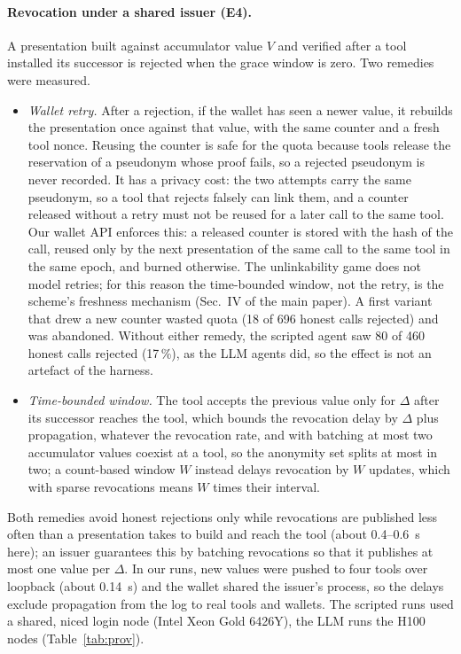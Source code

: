 \paragraph{Revocation under a shared issuer (E4).} A presentation built against accumulator value $V$ and verified after a tool installed its successor is rejected when the grace window is zero. Two remedies were measured.
\begin{itemize}[leftmargin=*]
\item \emph{Wallet retry.} After a rejection, if the wallet has seen a newer value, it rebuilds the presentation once against that value, with the same counter and a fresh tool nonce. Reusing the counter is safe for the quota because tools release the reservation of a pseudonym whose proof fails, so a rejected pseudonym is never recorded. It has a privacy cost: the two attempts carry the same pseudonym, so a tool that rejects falsely can link them, and a counter released without a retry must not be reused for a later call to the same tool. Our wallet API enforces this: a released counter is stored with the hash of the call, reused only by the next presentation of the same call to the same tool in the same epoch, and burned otherwise. The unlinkability game does not model retries; for this reason the time-bounded window, not the retry, is the scheme's freshness mechanism (Sec.~IV of the main paper). A first variant that drew a new counter wasted quota (18 of 696 honest calls rejected) and was abandoned. Without either remedy, the scripted agent saw 80 of 460 honest calls rejected (17\,\%), as the LLM agents did, so the effect is not an artefact of the harness.
\item \emph{Time-bounded window.} The tool accepts the previous value only for $\Delta$ after its successor reaches the tool, which bounds the revocation delay by $\Delta$ plus propagation, whatever the revocation rate, and with batching at most two accumulator values coexist at a tool, so the anonymity set splits at most in two; a count-based window $W$ instead delays revocation by $W$ updates, which with sparse revocations means $W$ times their interval.
\end{itemize}
Both remedies avoid honest rejections only while revocations are published less often than a presentation takes to build and reach the tool (about 0.4--0.6~s here); an issuer guarantees this by batching revocations so that it publishes at most one value per $\Delta$. In our runs, new values were pushed to four tools over loopback (about 0.14~s) and the wallet shared the issuer's process, so the delays exclude propagation from the log to real tools and wallets. The scripted runs used a shared, niced login node (Intel Xeon Gold 6426Y), the LLM runs the H100 nodes (Table~\ref{tab:prov}).
